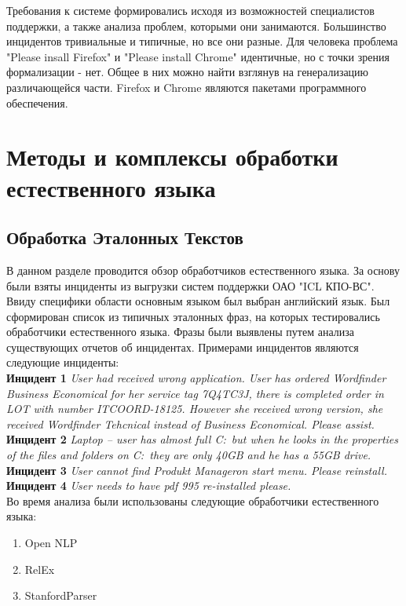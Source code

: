 Требования к системе формировались исходя из возможностей специалистов поддержки, а также анализа проблем, которыми они занимаются. Большинство инцидентов тривиальные и типичные, но все они разные. Для человека проблема "Please insall Firefox" и "Please install Chrome" идентичные, но с точки зрения формализации - нет. Общее в них можно найти взглянув на генерализацию различающейся части. Firefox и Chrome являются пакетами программного обеспечения.



\clearpage

\section{Методы и комплексы обработки естественного языка} \label{chapt2}

\subsection{Обработка Эталонных Текстов} \label{sect2_1}
В данном разделе проводится обзор обработчиков естественного языка. За основу были взяты инциденты из выгрузки систем поддержки ОАО "ICL КПО-ВС". \\
Ввиду специфики области основным языком был выбран английский язык. Был сформирован список из типичных эталонных фраз, на которых тестировались обработчики естественного языка. Фразы были выявлены путем анализа существующих отчетов об инцидентах. Примерами инцидентов являются следующие инциденты:\\
\textbf{Инцидент 1}
\textit{
User had received wrong application. User has ordered Wordfinder Business Economical for her service tag 7Q4TC3J, there is completed order in LOT with number ITCOORD-18125. However she received wrong version, she received Wordfinder Tehcnical instead of Business Economical. Please assist.
}\\
\textbf{Инцидент 2}
\textit{
Laptop – user has almost full C:\ but when he looks in the properties of the files and folders on C:\ they are only 40GB and he has a 55GB drive.
}\\
\textbf{Инцидент 3}
\textit{
User cannot find Produkt Manageron start menu. Please reinstall. 
}\\
\textbf{Инцидент 4}
\textit{
User needs to have pdf 995 re-installed please.
}\\

Во время анализа были использованы следующие обработчики естественного языка:
\begin {enumerate}
	\item{Open NLP}\cite{OpenNLP}
	\item{RelEx}\cite{OpenCogRelex}
	\item{StanfordParser}\cite{StanfordParser}
\end {enumerate}

